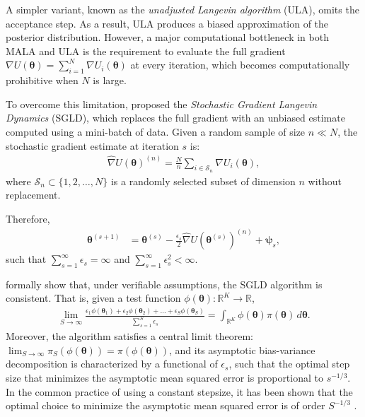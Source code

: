 A simpler variant, known as the \textit{unadjusted Langevin algorithm} (ULA), omits the acceptance step. As a result, ULA produces a biased approximation of the posterior distribution. However, a major computational bottleneck in both MALA and ULA is the requirement to evaluate the full gradient \( \nabla U(\boldsymbol{\theta}) = \sum_{i=1}^N \nabla U_i(\boldsymbol{\theta}) \) at every iteration, which becomes computationally prohibitive when \( N \) is large.

To overcome this limitation, \cite{welling2011bayesian} proposed the \textit{Stochastic Gradient Langevin Dynamics} (SGLD), which replaces the full gradient with an unbiased estimate computed using a mini-batch of data. Given a random sample of size \( n \ll N \), the stochastic gradient estimate at iteration \( s \) is:
\begin{align} \label{eq:grad}
	\hat{\nabla} U(\boldsymbol{\theta})^{(n)} = \frac{N}{n} \sum_{i \in \mathcal{S}_n} \nabla U_i(\boldsymbol{\theta}),
\end{align}
where \( \mathcal{S}_n \subset \{1, 2, \dots, N\} \) is a randomly selected subset of dimension $n$ without replacement.

Therefore, 
\begin{align*}
	\boldsymbol{\theta}^{(s+1)}&= \boldsymbol{\theta}^{(s)} -\frac{\epsilon_s}{2}\hat{\nabla} U(\boldsymbol{\theta}^{(s)})^{(n)}+\boldsymbol{\psi}_s,
\end{align*}
such that $\sum_{s=1}^{\infty}\epsilon_s=\infty$ and $\sum_{s=1}^{\infty}\epsilon_s^2<\infty$.

\cite{teh2016consistency} formally show that, under verifiable assumptions, the SGLD algorithm is consistent. That is, given a test function $\phi(\boldsymbol{\theta}): \mathbb{R}^K \rightarrow \mathbb{R}$,
\begin{align*}
	\lim_{S \rightarrow \infty} \frac{\epsilon_1 \phi(\boldsymbol{\theta}_1) + \epsilon_2 \phi(\boldsymbol{\theta}_2) + \dots + \epsilon_S \phi(\boldsymbol{\theta}_S)}{\sum_{s=1}^S \epsilon_s} = \int_{\mathbb{R}^K} \phi(\boldsymbol{\theta}) \pi(\boldsymbol{\theta}) \, d\boldsymbol{\theta}.
\end{align*}
Moreover, the algorithm satisfies a central limit theorem: $\lim_{S \rightarrow \infty} \pi_S(\phi(\boldsymbol{\theta})) = \pi(\phi(\boldsymbol{\theta}))$, and its asymptotic bias-variance decomposition is characterized by a functional of $\epsilon_s$, such that the optimal step size that minimizes the asymptotic mean squared error is proportional to $s^{-1/3}$. In the common practice of using a constant stepsize, it has been shown that the optimal choice to minimize the asymptotic mean squared error is of order \( S^{-1/3} \) \cite{vollmer2016exploration}. 

